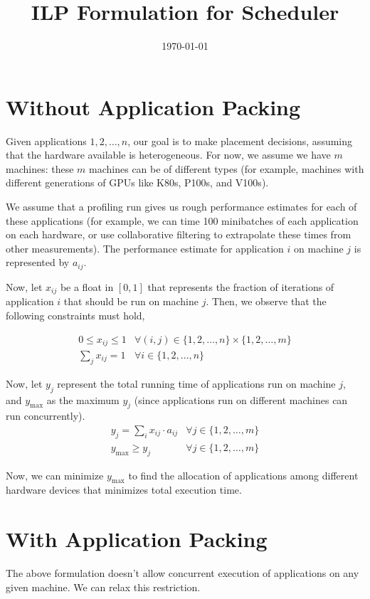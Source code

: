 \documentclass{article}
\title{ILP Formulation for Scheduler}
\date{\today}
\begin{document}
\maketitle

\section{Without Application Packing}
Given applications $1, 2, \ldots, n$, our goal is to make placement
decisions, assuming that the hardware available is heterogeneous. For now, we
assume we have $m$ machines: these $m$ machines can be of different types (for
example, machines with different generations of GPUs like K80s, P100s, and V100s).

We assume that a profiling run gives us rough performance estimates for each
of these applications (for example, we can time 100 minibatches of each application
on each hardware, or use collaborative filtering to extrapolate these
times from other measurements). The performance estimate for application $i$
on machine $j$ is represented by $a_{ij}$.

Now, let $x_{ij}$ be a float in $[0, 1]$ that represents the fraction of
iterations of application $i$ that should be run on
machine $j$. Then, we observe that the following constraints
must hold,

\begin{eqnarray}
0 \leq x_{ij} \leq 1 & \forall (i,j) \in \{1, 2, \ldots, n\} \times \{1, 2, \ldots, m\} \nonumber  \\
\sum_j x_{ij} = 1 & \forall i \in \{1, 2, \ldots, n\} \nonumber
\end{eqnarray}

Now, let $y_j$ represent the total running time of applications run on machine
$j$, and $y_{\text{max}}$ as the maximum $y_j$ (since applications run on different
machines can run concurrently).
\begin{eqnarray}
y_j = \sum_i x_{ij} \cdot a_{ij} & \forall j \in \{1, 2, \ldots, m\} \nonumber \\
y_{\text{max}} \geq y_j & \forall j \in \{1, 2, \ldots, m\} \nonumber
\end{eqnarray}

Now, we can minimize $y_{\text{max}}$ to find the allocation of applications
among different hardware devices that minimizes total execution time.

\section{With Application Packing}
The above formulation doesn't allow concurrent execution of applications
on any given machine. We can relax this restriction.
\end{document}
